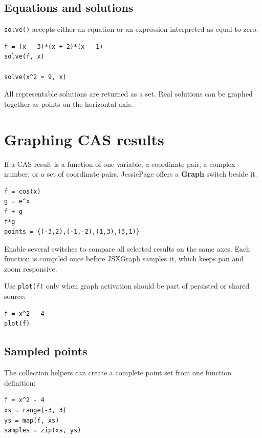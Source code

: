 \documentclass[11pt,a4paper]{article}
\newcommand{\ui}[1]{\textsf{\textbf{#1}}}
\newcommand{\code}[1]{\texttt{#1}}
\begin{document}
\subsection{Equations and solutions}

\code{solve()} accepts either an equation or an expression interpreted as equal to zero:

\begin{lstlisting}[style=jessie]
f = (x - 3)*(x + 2)*(x - 1)
solve(f, x)

solve(x^2 = 9, x)
\end{lstlisting}

All representable solutions are returned as a set. Real solutions can be graphed together as points on the horizontal axis.

\section{Graphing CAS results}

If a CAS result is a function of one variable, a coordinate pair, a complex number, or a set of coordinate pairs, JessiePage offers a \ui{Graph} switch beside it.

\begin{lstlisting}[style=jessie]
f = cos(x)
g = e^x
f + g
f*g
points = {(-3,2),(-1,-2),(1,3),(3,1)}
\end{lstlisting}

Enable several switches to compare all selected results on the same axes. Each function is compiled once before JSXGraph samples it, which keeps pan and zoom responsive.

Use \code{plot(f)} only when graph activation should be part of persisted or shared source:

\begin{lstlisting}[style=jessie]
f = x^2 - 4
plot(f)
\end{lstlisting}

\subsection{Sampled points}

The collection helpers can create a complete point set from one function definition:

\begin{lstlisting}[style=jessie]
f = x^2 - 4
xs = range(-3, 3)
ys = map(f, xs)
samples = zip(xs, ys)
\end{lstlisting}
\end{document}
